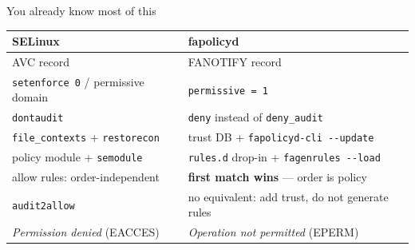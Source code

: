 \documentclass[aspectratio=169,11pt]{beamer}
\newcommand{\dd}{-{}-}
\begin{document}
\begin{frame}{You already know most of this}
  \centering\small
  \begin{tabular}{@{}ll@{}}
    \toprule
    \textbf{SELinux} & \textbf{fapolicyd} \\
    \midrule
    AVC record & FANOTIFY record \\
    \texttt{setenforce 0} / permissive domain & \texttt{permissive = 1} \\
    \texttt{dontaudit} & \texttt{deny} instead of \texttt{deny\_audit} \\
    \texttt{file\_contexts} + \texttt{restorecon} & trust DB + \texttt{fapolicyd-cli \dd update} \\
    policy module + \texttt{semodule} & \texttt{rules.d} drop-in + \texttt{fagenrules \dd load} \\
    allow rules: order-independent & \textbf{first match wins} --- order is policy \\
    \texttt{audit2allow} & no equivalent: add trust, do not generate rules \\
    \emph{Permission denied} (EACCES) & \emph{Operation not permitted} (EPERM) \\
    \bottomrule
  \end{tabular}
\end{frame}
\end{document}
